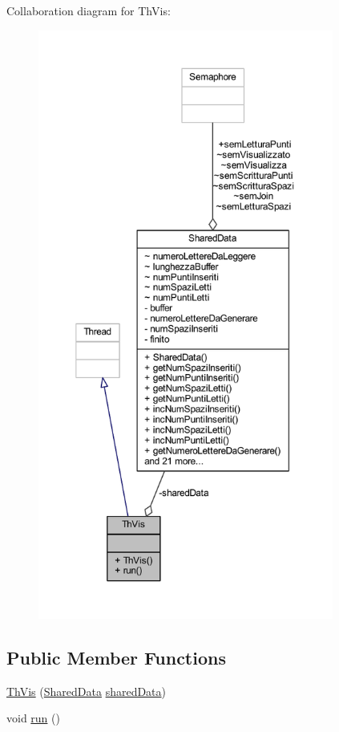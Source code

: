 Collaboration diagram for Th\+Vis\+:
\nopagebreak
\begin{figure}[H]
\begin{center}
\leavevmode
\includegraphics[height=550pt]{classmain_1_1_th_vis__coll__graph}
\end{center}
\end{figure}
\subsection*{Public Member Functions}
\begin{DoxyCompactItemize}
\item 
\mbox{\hyperlink{classmain_1_1_th_vis_aceb31c6e1bd06147c56dfaa16356dc88}{Th\+Vis}} (\mbox{\hyperlink{classmain_1_1_shared_data}{Shared\+Data}} \mbox{\hyperlink{classmain_1_1_th_vis_ac5f1128ef8d0ba91a8214e03732e2662}{shared\+Data}})
\item 
void \mbox{\hyperlink{classmain_1_1_th_vis_a13a43e6d814de94978c515cb084873b1}{run}} ()
\end{DoxyCompactItemize}
